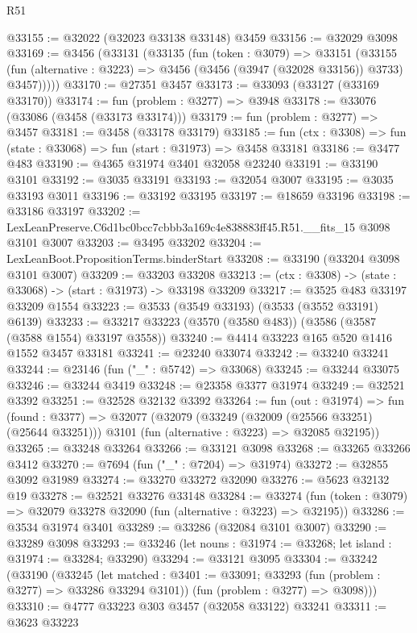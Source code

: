 \begin{lexlean}{R51}
\begin{coremodule}
@33155 := @32022 (@32023 @33138 @33148) @3459
@33156 := @32029 @3098
@33169 := @3456
    (@33131
      (@33135
        (fun (token : @3079) =>
        @33151
          (@33155
            (fun (alternative : @3223) => @3456 (@3456 (@3947 (@32028 @33156)) @3733) @3457)))))
@33170 := @27351 @3457
@33173 := @33093 (@33127 (@33169 @33170))
@33174 := fun (problem : @3277) => @3948
@33178 := @33076 (@33086 (@3458 (@33173 @33174)))
@33179 := fun (problem : @3277) => @3457
@33181 := @3458 (@33178 @33179)
@33185 := fun (ctx : @3308) => fun (state : @33068) => fun (start : @31973) => @3458 @33181
@33186 := @3477 @483
@33190 := @4365 @31974 @3401 @32058 @23240
@33191 := @33190 @3101
@33192 := @3035 @33191
@33193 := @32054 @3007
@33195 := @3035 @33193 @3011
@33196 := @33192 @33195
@33197 := @18659 @33196
@33198 := @33186 @33197
@33202 := LexLeanPreserve.C6d1bc0bcc7cbbb3a169c4e838883ff45.R51.__fits_15 @3098 @3101 @3007
@33203 := @3495 @33202
@33204 := LexLeanBoot.PropositionTerms.binderStart
@33208 := @33190 (@33204 @3098 @3101 @3007)
@33209 := @33203 @33208
@33213 := (ctx : @3308) -> (state : @33068) -> (start : @31973) -> @33198 @33209
@33217 := @3525 @483 @33197 @33209 @1554
@33223 := @3533 (@3549 @33193) (@3533 (@3552 @33191) @6139)
@33233 := @33217 @33223 (@3570 (@3580 @483)) (@3586 (@3587 (@3588 @1554) @33197 @3558))
@33240 := @4414 @33223 @165 @520 @1416 @1552 @3457 @33181
@33241 := @23240 @33074
@33242 := @33240 @33241
@33244 := @23146 (fun ("_" : @5742) => @33068)
@33245 := @33244 @33075
@33246 := @33244 @3419
@33248 := @23358 @3377 @31974
@33249 := @32521 @3392
@33251 := @32528 @32132 @3392
@33264 := fun (out : @31974) =>
  fun (found : @3377) =>
  @32077
    (@32079
      (@33249 (@32009 (@25566 @33251) (@25644 @33251)))
      @3101
      (fun (alternative : @3223) => @32085 @32195))
@33265 := @33248 @33264
@33266 := @33121 @3098
@33268 := @33265 @33266 @3412
@33270 := @7694 (fun ("_" : @7204) => @31974)
@33272 := @32855 @3092 @31989
@33274 := @33270 @33272 @32090
@33276 := @5623 @32132 @19
@33278 := @32521 @33276 @33148
@33284 := @33274 (fun (token : @3079) => @32079 @33278 @32090 (fun (alternative : @3223) => @32195))
@33286 := @3534 @31974 @3401
@33289 := @33286 (@32084 @3101 @3007)
@33290 := @33289 @3098
@33293 := @33246 (let nouns : @31974 := @33268; let island : @31974 := @33284; @33290)
@33294 := @33121 @3095
@33304 := @33242
    (@33190
      (@33245
        (let matched : @3401 := @33091; @33293 (fun (problem : @3277) => @33286 @33294 @3101))
        (fun (problem : @3277) => @3098)))
@33310 := @4777 @33223 @303 @3457 (@32058 @33122) @33241
@33311 := @3623 @33223

\end{coremodule}
\end{lexlean}
